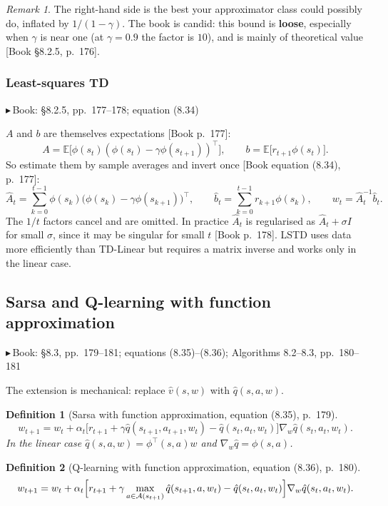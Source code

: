 \documentclass[11pt, letterpaper]{article}
\theoremstyle{runin}
\newtheorem*{definition}{Definition}
\theoremstyle{runinplain}
\theoremstyle{remark}
\newtheorem*{remark}{Remark}
\newcommand{\E}{\mathbb{E}}
\newcommand{\Aspace}{\mathcal{A}}
\newcommand{\bk}[1]{{\color{bookblue}\small$\blacktriangleright$\,\textsf{Book: #1}}}
\newcommand{\bkin}[1]{{\color{bookblue}\small[\textsf{Book #1}]}}
\begin{document}
\begin{remark}
The right-hand side is the best your approximator class could possibly do, inflated
by $1/(1-\gamma)$. The book is candid: this bound is \textbf{loose}, especially when
$\gamma$ is near one (at $\gamma=0.9$ the factor is $10$), and is mainly of
theoretical value \bkin{\S8.2.5, p.~176}.
\end{remark}

\subsubsection{Least-squares TD}

\bk{\S8.2.5, pp.~177--178; equation (8.34)}

$A$ and $b$ are themselves expectations \bkin{p.~177}:
\[
  A=\E\bigl[\phi(s_t)(\phi(s_t)-\gamma\phi(s_{t+1}))^{\!\top}\bigr],
  \qquad
  b=\E\bigl[r_{t+1}\phi(s_t)\bigr].
\]
So estimate them by sample averages and invert once
\bkin{equation (8.34), p.~177}:
\[
  \hat A_t=\sum_{k=0}^{t-1}\phi(s_k)\bigl(\phi(s_k)-\gamma\phi(s_{k+1})\bigr)^{\!\top},
  \qquad
  \hat b_t=\sum_{k=0}^{t-1}r_{k+1}\phi(s_k),
  \qquad
  w_t=\hat A_t^{-1}\hat b_t .
\]
The $1/t$ factors cancel and are omitted. In practice $\hat A_t$ is regularised as
$\hat A_t+\sigma I$ for small $\sigma$, since it may be singular for small $t$
\bkin{p.~178}. LSTD uses data more efficiently than TD-Linear but requires a matrix
inverse and works only in the linear case.

\subsection{Sarsa and Q-learning with function approximation}

\bk{\S8.3, pp.~179--181; equations (8.35)--(8.36); Algorithms 8.2--8.3, pp.~180--181}

The extension is mechanical: replace $\hat v(s,w)$ with $\hat q(s,a,w)$.

\begin{definition}[Sarsa with function approximation, equation (8.35), p.~179]
\[
  w_{t+1}=w_t+\alpha_t\bigl[r_{t+1}+\gamma\hat q(s_{t+1},a_{t+1},w_t)-\hat q(s_t,a_t,w_t)\bigr]
    \nabla_w\hat q(s_t,a_t,w_t).
\]
In the linear case $\hat q(s,a,w)=\phi^{\!\top}(s,a)w$ and
$\nabla_w\hat q=\phi(s,a)$.
\end{definition}

\begin{definition}[Q-learning with function approximation, equation (8.36), p.~180]
\[
  w_{t+1}=w_t+\alpha_t\Bigl[r_{t+1}+\gamma\max_{a\in\Aspace(s_{t+1})}\hat q(s_{t+1},a,w_t)-\hat q(s_t,a_t,w_t)\Bigr]
    \nabla_w\hat q(s_t,a_t,w_t).
\]
\end{definition}
\end{document}
